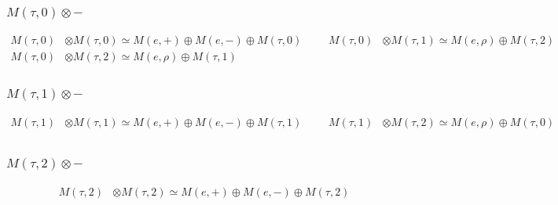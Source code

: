 \subsubsection{$ M(\tau,0)\otimes -$}
\begin{align*}
M(\tau,0) &\otimes M(\tau,0) \simeq M(e,+) \oplus M(e,-) \oplus M(\tau,0) &&& M(\tau,0) &\otimes M(\tau,1) \simeq M(e,\rho) \oplus M(\tau,2)\\
M(\tau,0) &\otimes M(\tau,2) \simeq M(e,\rho) \oplus M(\tau,1)
\end{align*}

\subsubsection{$ M(\tau,1)\otimes -$}
\begin{align*}
M(\tau,1) &\otimes M(\tau,1) \simeq M(e,+) \oplus M(e,-) \oplus M(\tau,1) &&& M(\tau,1) &\otimes M(\tau,2) \simeq M(e,\rho) \oplus M(\tau,0)\\
\end{align*}

\subsubsection{$ M(\tau,2)\otimes -$}
\begin{align*}
M(\tau,2) &\otimes M(\tau,2) \simeq M(e,+) \oplus M(e,-) \oplus M(\tau,2)
\end{align*}

